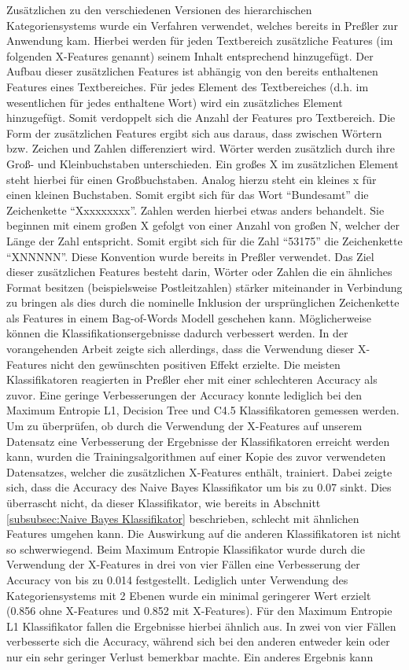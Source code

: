 Zusätzlichen zu den verschiedenen Versionen des hierarchischen Kategoriensystems wurde ein Verfahren verwendet, welches bereits in Preßler \cite{Pressler2014} zur Anwendung kam. Hierbei werden für jeden Textbereich zusätzliche Features (im folgenden X-Features genannt) seinem Inhalt entsprechend hinzugefügt. Der Aufbau dieser zusätzlichen Features ist abhängig von den bereits enthaltenen Features eines Textbereiches. Für jedes Element des Textbereiches (d.h. im wesentlichen für jedes enthaltene Wort) wird ein zusätzliches Element hinzugefügt. Somit verdoppelt sich die Anzahl der Features pro Textbereich. Die Form der zusätzlichen Features ergibt sich aus daraus, dass zwischen Wörtern bzw. Zeichen und Zahlen differenziert wird. Wörter werden zusätzlich durch ihre Groß- und Kleinbuchstaben unterschieden. Ein großes X im zusätzlichen Element steht hierbei für einen Großbuchstaben. Analog hierzu steht ein kleines x für einen kleinen Buchstaben. Somit ergibt sich für das Wort "`Bundesamt"' die Zeichenkette "`Xxxxxxxxx"'. Zahlen werden hierbei etwas anders behandelt. Sie beginnen mit einem großen X gefolgt von einer Anzahl von großen N, welcher der Länge der Zahl entspricht. Somit ergibt sich für die Zahl "`53175"' die Zeichenkette "`XNNNNN"'. Diese Konvention wurde bereits in Preßler \cite{Pressler2014} verwendet. Das Ziel dieser zusätzlichen Features besteht darin, Wörter oder Zahlen die ein ähnliches Format besitzen (beispielsweise Postleitzahlen) stärker miteinander in Verbindung zu bringen als dies durch die nominelle Inklusion der ursprünglichen Zeichenkette als Features in einem Bag-of-Words Modell geschehen kann. Möglicherweise können die Klassifikationsergebnisse dadurch verbessert werden. In der vorangehenden Arbeit zeigte sich allerdings, dass die Verwendung dieser X-Features nicht den gewünschten positiven Effekt erzielte. Die meisten Klassifikatoren reagierten in Preßler \cite{Pressler2014} eher mit einer schlechteren Accuracy als zuvor. Eine geringe Verbesserungen der Accuracy konnte lediglich bei den Maximum Entropie L1, Decision Tree und C4.5 Klassifikatoren gemessen werden. Um zu überprüfen, ob durch die Verwendung der X-Features auf unserem Datensatz eine Verbesserung der Ergebnisse der Klassifikatoren erreicht werden kann, wurden die Trainingsalgorithmen auf einer Kopie des zuvor verwendeten Datensatzes, welcher die zusätzlichen X-Features enthält, trainiert. Dabei zeigte sich, dass die Accuracy des Naive Bayes Klassifikator um bis zu 0.07 sinkt. Dies überrascht nicht, da dieser Klassifikator, wie bereits in Abschnitt \ref{subsubsec:Naive Bayes Klassifikator} beschrieben, schlecht mit ähnlichen Features umgehen kann. Die Auswirkung auf die anderen Klassifikatoren ist nicht so schwerwiegend. Beim Maximum Entropie Klassifikator wurde durch die Verwendung der X-Features in drei von vier Fällen eine Verbesserung der Accuracy von bis zu 0.014 festgestellt. Lediglich unter Verwendung des Kategoriensystems mit 2 Ebenen wurde ein minimal geringerer Wert erzielt (0.856 ohne X-Features und 0.852 mit X-Features). Für den Maximum Entropie L1 Klassifikator fallen die Ergebnisse hierbei ähnlich aus. In zwei von vier Fällen verbesserte sich die Accuracy, während sich bei den anderen entweder kein oder nur ein sehr geringer Verlust bemerkbar machte. Ein anderes Ergebnis kann 